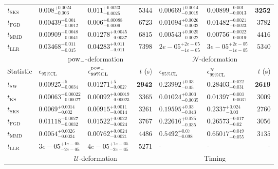 \begin{tabular}{l|llr|llr}
	$t_{\mathrm{SKS}}$ & $0.008_{-0.003}^{+0.0024}$ & $0.011_{-0.0025}^{+0.0023}$ & $5344$ & $0.00669_{-0.0019}^{+0.0014}$ & $0.00899_{-0.0013}^{+0.001}$ & ${\mathbf{3252}}$ \\
	$t_{\mathrm{FGD}}$ & ${\mathbf{0.00439_{-0.0012}^{+0.001}}}$ & ${\mathbf{0.006_{-0.0009}^{+0.00088}}}$ & $6723$ & $0.01094_{-0.0032}^{+0.0026}$ & $0.01482_{-0.0023}^{+0.0021}$ & $3782$ \\
	$t_{\mathrm{MMD}}$ & $0.00909_{-0.0041}^{+0.0048}$ & $0.01278_{-0.0037}^{+0.0045}$ & $6815$ & $0.00543_{-0.0022}^{+0.0025}$ & $0.00756_{-0.0019}^{+0.0022}$ & $4416$ \\
	$t_{\mathrm{LLR}}$ & $0.03468_{-0.015}^{+0.011}$ & $0.04283_{-0.011}^{+0.011}$ & $7398$ & $2e-05_{-1e-05}^{+2e-05}$ & $3e-05_{-1e-05}^{+2e-05}$ & $5340$ \\
	\toprule
	\multicolumn{1}{c}{} & \multicolumn{3}{c}{$\rm{pow}_{-}$-deformation} & \multicolumn{3}{c}{$\mathcal{N}$-deformation} \\
	Statistic & $\epsilon_{95\%\mathrm{CL}}$ & $\epsilon^  {\rm{pow}_{-}}_{99\%\mathrm{CL}}$ & $t$ (s) & $\epsilon_{95\%\mathrm{CL}}$ & $\epsilon^    {\mathcal{N}}_{99\%\mathrm{CL}}$ & $t$ (s) \\
	\midrule
	$t_{\mathrm{SW}}$ & $0.00925_{-0.0034}^{+5}$ & $0.01271_{-0.0027}^{+5}$ & ${\mathbf{2942}}$ & $0.23992_{-0.05}^{+0.03}$ & $0.28403_{-0.031}^{+0.022}$ & ${\mathbf{2619}}$ \\
	$t_{\overline{\mathrm{KS}}}$ & ${\mathbf{0.00063_{-0.00027}^{+0.00022}}}$ & ${\mathbf{0.00092_{-0.00023}^{+0.00019}}}$ & $3365$ & ${\mathbf{0.01024_{-0.0035}^{+0.003}}}$ & ${\mathbf{0.01397_{-0.0031}^{+0.003}}}$ & $3009$ \\
	$t_{\mathrm{SKS}}$ & $0.0069_{-0.002}^{+0.0014}$ & $0.00915_{-0.0014}^{+0.0011}$ & $3261$ & $0.19595_{-0.043}^{+0.03}$ & $0.2337_{-0.03}^{+0.024}$ & $2760$ \\
	$t_{\mathrm{FGD}}$ & $0.01118_{-0.0032}^{+0.0027}$ & $0.01522_{-0.0024}^{+0.0022}$ & $3767$ & $0.22616_{-0.035}^{+0.025}$ & $0.26573_{-0.02}^{+0.017}$ & $3056$ \\
	$t_{\mathrm{MMD}}$ & $0.0054_{-0.0024}^{+0.0026}$ & $0.00762_{-0.0021}^{+0.0024}$ & $4486$ & $0.5492_{-0.098}^{+0.07}$ & $0.65017_{-0.055}^{+0.049}$ & $3135$ \\
	$t_{\mathrm{LLR}}$ & $3e-05_{-2e-05}^{+1e-05}$ & $4e-05_{-2e-05}^{+1e-05}$ & $5271$ & - & - & - \\
	\toprule
	\multicolumn{1}{c}{} & \multicolumn{3}{c}{$\mathcal{U}$-deformation} & \multicolumn{3}{c}{Timing} \\

\end{tabular}

